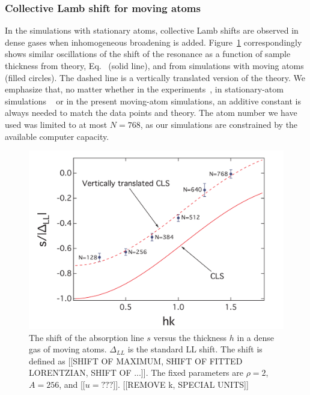 \subsubsection{Collective Lamb shift for moving atoms}
 
In the simulations with stationary atoms, collective Lamb shifts are observed in dense gases when inhomogeneous broadening is added. Figure~\ref{CLS} correspondingly shows similar oscillations of the shift of the resonance as a function of sample thickness from theory, Eq.~ (solid line),  and from simulations with moving atoms (filled circles). The dashed line is a vertically translated version of the theory. We emphasize that, no matter whether in the experiments~\cite{PhysRevLett.108.173601}, in stationary-atom simulations ~\cite{PhysRevLett.112.113603} or in the present moving-atom simulations,  an additive constant is always needed to match the data points and theory.  The atom number we have used was limited to at most $N=768$, as our simulations are constrained by the available computer capacity. 

\begin{figure}[h!]
\begin{center}
\includegraphics[width=\textwidth]{CLS.pdf}
\end{center}
\caption{The shift of the absorption line $s$ versus the thickness $h$ in a dense gas of moving atoms. $\Delta_{LL}$ is the standard LL shift. The shift is defined as [[SHIFT OF MAXIMUM, SHIFT OF FITTED LORENTZIAN, SHIFT OF ...]].  The fixed parameters are $\rho=2$, $A=256$, and [[$u=???$]]. [[REMOVE k, SPECIAL UNITS]]}
\label{CLS}
\end{figure}

